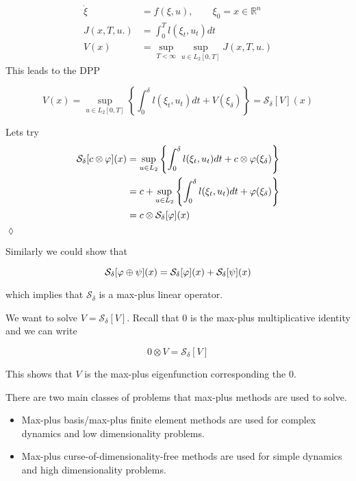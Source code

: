 \begin{example}
\begin{align*}
\dot{\xi} &= f(\xi,u), \qquad \xi_0=x\in\mathbb{R}^n \\
J(x,T,u.) &= \int_0^T l(\xi_t,u_t)dt \\
V(x) &= \sup_{T<\infty}\sup_{u\in L_2[0,T]}J(x,T,u.)
\end{align*}
This leads to the DPP

\begin{equation*}
V(x) = \sup_{u\in L_2[0,T]}\left\lbrace \int_0^\delta l(\xi_t,u_t)dt + V(\xi_\delta) \right\rbrace = \mathcal{S}_\delta[V](x)
\end{equation*}

Lets try
\begin{align*}
\mathcal{S}_\delta[c\otimes\varphi](x) &= \sup_{u\in L_2}\left\lbrace \int_0^\delta l(\xi_t,u_t)dt + c\otimes\varphi(\xi_\delta) \right\rbrace \\
&= c + \sup_{u\in L_2}\left\lbrace \int_0^\delta l(\xi_t,u_t)dt + \varphi(\xi_\delta)\right\rbrace \\
&= c\otimes\mathcal{S}_\delta[\varphi](x)
\end{align*}
$\lozenge$
\end{example}

Similarly we could show that

\begin{equation*}
\mathcal{S}_\delta[\varphi\oplus\psi](x) = \mathcal{S}_\delta[\varphi](x) + \mathcal{S}_\delta[\psi](x)
\end{equation*}

which implies that $\mathcal{S}_\delta$ is a max-plus linear operator.

We want to solve $V=\mathcal{S}_\delta[V]$.
Recall that $0$ is the max-plus multiplicative identity and we can write

\begin{equation*}
0\otimes V=\mathcal{S}_\delta[V]
\end{equation*}

This shows that $V$ is the max-plus eigenfunction corresponding the $0$.

There are two main classes of problems that max-plus methods are used to solve.
\begin{itemize}
\item Max-plus basis/max-plus finite element methods are used for complex dynamics and low dimensionality problems.
\item Max-plus curse-of-dimensionality-free methods are used for simple dynamics and high dimensionality problems.
\end{itemize}

